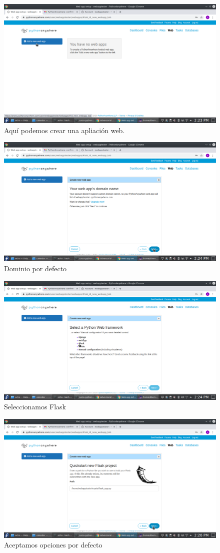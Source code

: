 \documentclass[10pt,a4paper]{article}
\begin{document}
\begin{figure}
	\centering
	\includegraphics[width=0.7\linewidth]{sc/webapp_create}
	\caption{Aquí podemos crear una apliación web.}
	\label{fig:webappcreate}
\end{figure}

\begin{figure}
	\centering
	\includegraphics[width=0.7\linewidth]{sc/webapp_domain}
	\caption{Dominio por defecto}
	\label{fig:webappdomain}
\end{figure}

\begin{figure}
	\centering
	\includegraphics[width=0.7\linewidth]{sc/webapp_flask}
	\caption{Seleccionamos Flask}
	\label{fig:webappflask}
\end{figure}


\begin{figure}
	\centering
	\includegraphics[width=0.7\linewidth]{sc/webapp_mysite}
	\caption{Aceptamos opciones por defecto}
	\label{fig:webappmysite}
\end{figure}
\end{document}
